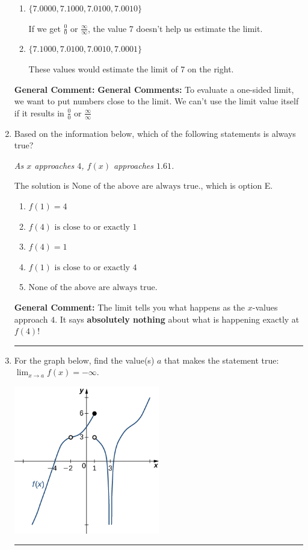 \documentclass{extbook}[14pt]
\newcommand{\litem}[1]{\item #1

\rule{\textwidth}{0.4pt}}
\begin{document}
\begin{enumerate}
{\begin{enumerate}[label=\Alph*.]
This is correct!
\item \( \{ 7.0000, 7.1000, 7.0100, 7.0010 \} \)

If we get $\frac{0}{0}$ or $\frac{\infty}{\infty}$, the value 7 doesn't help us estimate the limit.
\item \( \{ 7.1000, 7.0100, 7.0010, 7.0001 \} \)

These values would estimate the limit of 7 on the right.
\end{enumerate}

\textbf{General Comment:} \textbf{General Comments:} To evaluate a one-sided limit, we want to put numbers close to the limit. We can't use the limit value itself if it results in $\frac{0}{0}$ or $\frac{\infty}{\infty}$
}
\litem{
Based on the information below, which of the following statements is always true?

\begin{center}
    \textit{ As $x$ approaches $4$, $f(x)$ approaches $1.61$. }
\end{center}
The solution is \( \text{None of the above are always true.} \), which is option E.\begin{enumerate}[label=\Alph*.]
\item \( f(1) = 4 \)


\item \( f(4) \text{ is close to or exactly } 1 \)


\item \( f(4) = 1 \)


\item \( f(1) \text{ is close to or exactly } 4 \)


\item \( \text{None of the above are always true.} \)


\end{enumerate}

\textbf{General Comment:} The limit tells you what happens as the $x$-values approach $4$. It says \textbf{absolutely nothing} about what is happening exactly at $f(4)$!
}
\litem{
For the graph below, find the value(s) $a$ that makes the statement true: $ \displaystyle \lim_{x \rightarrow a} f(x) = -\infty$.

\begin{center}
    \includegraphics[width=0.5\textwidth]{../Figures/evaluateLimitGraphicallyCopyB.png}
\end{center}


}
\end{enumerate}
\end{document}

